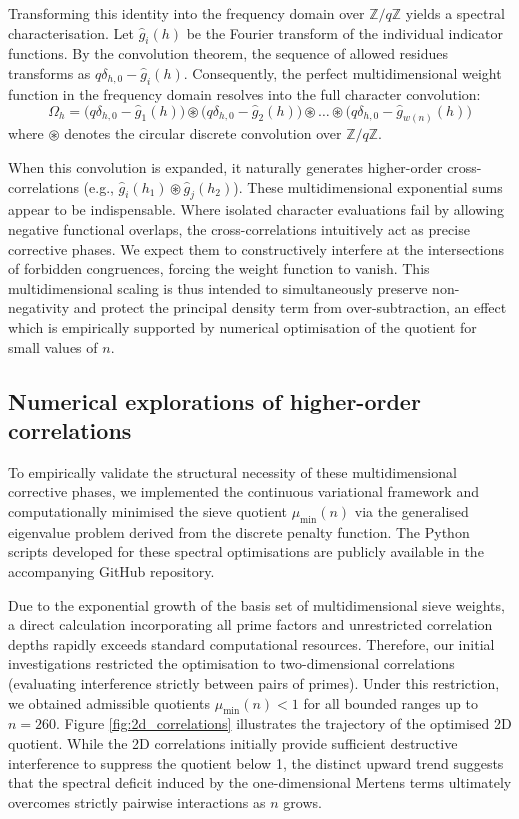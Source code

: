 \documentclass[10pt,twoside]{article}
\theoremstyle{cpctheorem}
\theoremstyle{cpcremark}
\begin{document}
Transforming this identity into the frequency domain over $\mathbb{Z}/q\mathbb{Z}$
yields a spectral characterisation. Let $\hat{g}_i(h)$ be the Fourier transform
of the individual indicator functions. By the convolution theorem, the sequence of allowed
residues transforms as $q\delta_{h,0} - \hat{g}_i(h)$. Consequently, the
perfect multidimensional weight function in the frequency domain resolves into the full
character convolution:
\[ \Omega_h = \big(q\delta_{h,0} - \hat{g}_1(h)\big) \circledast \big(q\delta_{h,0} - \hat{g}_2(h)\big) \circledast \dots \circledast \big(q\delta_{h,0} - \hat{g}_{w(n)}(h)\big) \]
where $\circledast$ denotes the circular discrete convolution over $\mathbb{Z}/q\mathbb{Z}$.

When this convolution is expanded, it naturally generates higher-order cross-correlations (e.g.,
$\hat{g}_i(h_1) \circledast \hat{g}_j(h_2)$). These multidimensional exponential sums appear to be
indispensable. Where isolated character evaluations fail by allowing negative functional overlaps, the
cross-correlations intuitively act as precise corrective phases. We expect them to constructively
interfere at the intersections of forbidden congruences, forcing the weight function to vanish. This
multidimensional scaling is thus intended to simultaneously preserve non-negativity and protect
the principal density term from over-subtraction, an effect which is empirically supported by
numerical optimisation of the quotient for small values of $n$.

\subsection{Numerical explorations of higher-order correlations}

To empirically validate the structural necessity of these multidimensional corrective phases, we
implemented the continuous variational framework and computationally minimised the sieve quotient
$\mu_{\min}(n)$ via the generalised eigenvalue problem derived from the discrete penalty function.
The Python scripts developed for these spectral optimisations are publicly available in the
accompanying GitHub repository.

Due to the exponential growth of the basis set of multidimensional sieve weights, a direct
calculation incorporating all prime factors and unrestricted correlation depths rapidly exceeds
standard computational resources. Therefore, our initial investigations restricted the optimisation
to two-dimensional correlations (evaluating interference strictly between pairs of primes). Under
this restriction, we obtained admissible quotients $\mu_{\min}(n) < 1$ for all
bounded ranges up to $n = 260$. Figure \ref{fig:2d_correlations} illustrates the trajectory of the
optimised 2D quotient. While the 2D correlations initially provide sufficient destructive
interference to suppress the quotient below 1, the distinct upward trend suggests that the spectral
deficit induced by the one-dimensional Mertens terms ultimately overcomes strictly pairwise
interactions as $n$ grows.
\end{document}
